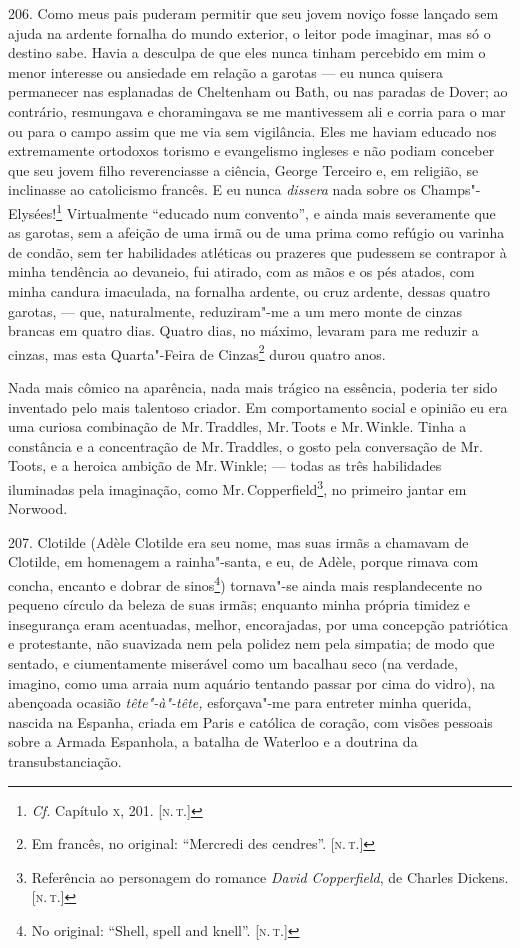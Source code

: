206. Como meus pais puderam permitir que seu jovem noviço fosse lançado
sem ajuda na ardente fornalha do mundo exterior, o leitor pode imaginar,
mas só o destino sabe. Havia a desculpa de que eles nunca tinham
percebido em mim o menor interesse ou ansiedade em relação a garotas ---
eu nunca quisera permanecer nas esplanadas de Cheltenham ou Bath, ou nas
paradas de Dover; ao contrário, resmungava e choramingava se me
mantivessem ali e corria para o mar ou para o campo assim que me via sem
vigilância. Eles me haviam educado nos extremamente ortodoxos torismo e
evangelismo ingleses e não podiam conceber que seu jovem filho
reverenciasse a ciência, George Terceiro e, em religião, se inclinasse
ao catolicismo francês. E eu nunca \emph{dissera} nada sobre os
Champs"-Elysées!\footnote{\emph{Cf.} Capítulo \textsc{x}, 201. {[}\textsc{n.\,t.}{]}}
Virtualmente ``educado num convento'', e ainda mais severamente que as
garotas, sem a afeição de uma irmã ou de uma prima como refúgio ou
varinha de condão, sem ter habilidades atléticas ou prazeres que
pudessem se contrapor à minha tendência ao devaneio, fui atirado, com as
mãos e os pés atados, com minha candura imaculada, na fornalha ardente,
ou cruz ardente, dessas quatro garotas, --- que, naturalmente,
reduziram"-me a um mero monte de cinzas brancas em quatro dias. Quatro
dias, no máximo, levaram para me reduzir a cinzas, mas esta Quarta"-Feira
de Cinzas\footnote{Em francês, no original: ``Mercredi des cendres''.
  {[}\textsc{n.\,t.}{]}} durou quatro anos.

Nada mais cômico na aparência, nada mais trágico na essência, poderia
ter sido inventado pelo mais talentoso criador. Em comportamento social
e opinião eu era uma curiosa combinação de Mr.\,Traddles, Mr.\,Toots e Mr.\,Winkle. Tinha a constância e a concentração de Mr.\,Traddles, o gosto pela
conversação de Mr.\,Toots, e a heroica ambição de Mr.\,Winkle; --- todas as
três habilidades iluminadas pela imaginação, como Mr.\,Copperfield\footnote{Referência ao personagem do romance \emph{David
  Copperfield}, de Charles Dickens. {[}\textsc{n.\,t.}{]}}, no primeiro jantar
em Norwood.

207. Clotilde (Adèle Clotilde era seu nome, mas suas irmãs a chamavam de
Clotilde, em homenagem a rainha"-santa, e eu, de Adèle, porque rimava com
concha, encanto e dobrar de sinos\footnote{No original: ``Shell, spell
  and knell''. {[}\textsc{n.\,t.}{]}}) tornava"-se ainda mais resplandecente no
pequeno círculo da beleza de suas irmãs; enquanto minha própria timidez
e insegurança eram acentuadas, melhor, encorajadas, por uma concepção
patriótica e protestante, não suavizada nem pela polidez nem pela
simpatia; de modo que sentado, e ciumentamente miserável como um
bacalhau seco (na verdade, imagino, como uma arraia num aquário tentando
passar por cima do vidro), na abençoada ocasião \emph{tête"-à"-tête,}
esforçava"-me para entreter minha querida, nascida na Espanha, criada em
Paris e católica de coração, com visões pessoais sobre a Armada
Espanhola, a batalha de Waterloo e a doutrina da transubstanciação.

